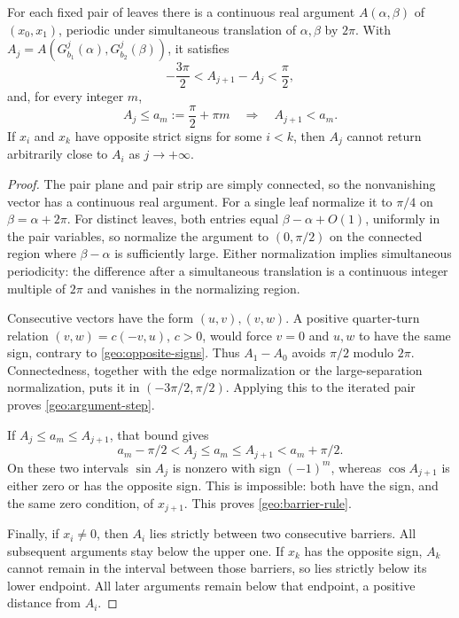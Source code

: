 \begin{lemma}\label{geo:barrier}
For each fixed pair of leaves there is a continuous real argument
$A(\alpha,\beta)$ of $(x_0,x_1)$, periodic under simultaneous translation
of $\alpha,\beta$ by $2\pi$.  With
$A_j=A(G_{b_1}^j(\alpha),G_{b_2}^j(\beta))$, it satisfies
\begin{equation}\label{geo:argument-step}
 -\frac{3\pi}{2}<A_{j+1}-A_j<\frac\pi2,
\end{equation}
and, for every integer $m$,
\begin{equation}\label{geo:barrier-rule}
 A_j\le a_m:=\frac\pi2+\pi m
       \quad\Longrightarrow\quad A_{j+1}<a_m.
\end{equation}
If $x_i$ and $x_k$ have opposite strict signs for some $i<k$, then
$A_j$ cannot return arbitrarily close to $A_i$ as $j\to+\infty$.
\end{lemma}

\begin{proof}
The pair plane and pair strip are simply connected, so the nonvanishing
vector has a continuous real argument.  For a single leaf normalize it
to $\pi/4$ on $\beta=\alpha+2\pi$.  For distinct leaves, both entries
equal $\beta-\alpha+O(1)$, uniformly in the pair variables, so normalize
the argument to $(0,\pi/2)$ on the connected region where
$\beta-\alpha$ is sufficiently large.  Either normalization implies
simultaneous periodicity: the difference after a simultaneous translation
is a continuous integer multiple of $2\pi$ and vanishes in the
normalizing region.

Consecutive vectors have the form $(u,v),(v,w)$.  A positive
quarter-turn relation $(v,w)=c(-v,u)$, $c>0$, would force $v=0$
and $u,w$ to have the same sign, contrary to
\eqref{geo:opposite-signs}.  Thus $A_1-A_0$ avoids $\pi/2$ modulo
$2\pi$.  Connectedness, together with the edge normalization or the
large-separation normalization, puts it in $(-3\pi/2,\pi/2)$.
Applying this to the iterated pair proves \eqref{geo:argument-step}.

If $A_j\le a_m\le A_{j+1}$, that bound gives
\[
 a_m-\pi/2<A_j\le a_m\le A_{j+1}<a_m+\pi/2.
\]
On these two intervals $\sin A_j$ is nonzero with sign $(-1)^m$,
whereas $\cos A_{j+1}$ is either zero or has the opposite sign.  This
is impossible: both have the sign, and the same zero condition, of
$x_{j+1}$.  This proves \eqref{geo:barrier-rule}.

Finally, if $x_i\ne0$, then $A_i$ lies strictly between two consecutive
barriers.  All subsequent arguments stay below the upper one.  If
$x_k$ has the opposite sign, $A_k$ cannot remain in the interval
between those barriers, so lies strictly below its lower endpoint.
All later arguments remain below that endpoint, a positive distance
from $A_i$.
\end{proof}

